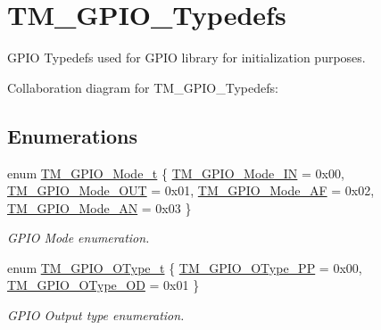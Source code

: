 \hypertarget{group___t_m___g_p_i_o___typedefs}{}\section{T\+M\+\_\+\+G\+P\+I\+O\+\_\+\+Typedefs}
\label{group___t_m___g_p_i_o___typedefs}


G\+P\+IO Typedefs used for G\+P\+IO library for initialization purposes.  


Collaboration diagram for T\+M\+\_\+\+G\+P\+I\+O\+\_\+\+Typedefs\+:
\subsection*{Enumerations}
\begin{DoxyCompactItemize}
\item 
enum \hyperlink{group___t_m___g_p_i_o___typedefs_gacbb363a57d0e70ea563e494eff1db3ca}{T\+M\+\_\+\+G\+P\+I\+O\+\_\+\+Mode\+\_\+t} \{ \hyperlink{group___t_m___g_p_i_o___typedefs_ggacbb363a57d0e70ea563e494eff1db3caa4a1a1cac84d610e1498af9207babf8cf}{T\+M\+\_\+\+G\+P\+I\+O\+\_\+\+Mode\+\_\+\+IN} = 0x00, 
\hyperlink{group___t_m___g_p_i_o___typedefs_ggacbb363a57d0e70ea563e494eff1db3caa6e5728698978e1610a61c1c3c6fab961}{T\+M\+\_\+\+G\+P\+I\+O\+\_\+\+Mode\+\_\+\+O\+UT} = 0x01, 
\hyperlink{group___t_m___g_p_i_o___typedefs_ggacbb363a57d0e70ea563e494eff1db3caaa8f2be5601e2cb483e95b035423054c7}{T\+M\+\_\+\+G\+P\+I\+O\+\_\+\+Mode\+\_\+\+AF} = 0x02, 
\hyperlink{group___t_m___g_p_i_o___typedefs_ggacbb363a57d0e70ea563e494eff1db3caa1654d8b26d95020f254506ff9164c07a}{T\+M\+\_\+\+G\+P\+I\+O\+\_\+\+Mode\+\_\+\+AN} = 0x03
 \}\begin{DoxyCompactList}\small\item\em G\+P\+IO Mode enumeration. \end{DoxyCompactList}
\item 
enum \hyperlink{group___t_m___g_p_i_o___typedefs_ga1d443fe266a4073f40ea271ae7b8df9f}{T\+M\+\_\+\+G\+P\+I\+O\+\_\+\+O\+Type\+\_\+t} \{ \hyperlink{group___t_m___g_p_i_o___typedefs_gga1d443fe266a4073f40ea271ae7b8df9fab1326cfb732c83fde91b8910de64465f}{T\+M\+\_\+\+G\+P\+I\+O\+\_\+\+O\+Type\+\_\+\+PP} = 0x00, 
\hyperlink{group___t_m___g_p_i_o___typedefs_gga1d443fe266a4073f40ea271ae7b8df9fa075f8c992f11c2379570a5a2deb2061c}{T\+M\+\_\+\+G\+P\+I\+O\+\_\+\+O\+Type\+\_\+\+OD} = 0x01
 \}\begin{DoxyCompactList}\small\item\em G\+P\+IO Output type enumeration. \end{DoxyCompactList}

\end{DoxyCompactItemize}
